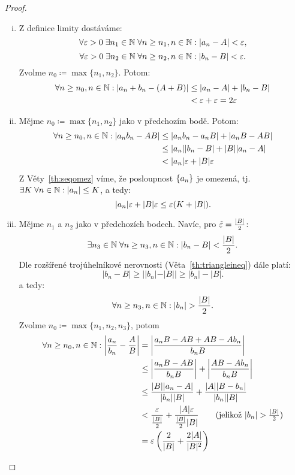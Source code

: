 \begin{proof}
    \leavevmode
    \begin{enumerate}[i.]
        \item Z definice limity dostáváme:
            $$\forall \varepsilon > 0 \; \exists n_1 \in \mathbb{N} \; \forall n \geq n_1,n\in \mathbb{N}: 
            |a_n - A| < \varepsilon,$$
            $$\forall \varepsilon > 0 \; \exists n_2 \in \mathbb{N} \; \forall n \geq n_2,n\in \mathbb{N}: 
            |b_n - B| < \varepsilon.$$
            Zvolme $n_0 \coloneqq \max\{n_1,n_2\}.$ Potom:
            \begin{align*}
                \forall n \geq n_0, n\in \mathbb{N}: 
                    |a_n + b_n - (A+B)| &\leq |a_n - A| + |b_n - B| \\
                                        &< \varepsilon + \varepsilon = 2\varepsilon
            \end{align*}
        \item Mějme $n_0 \coloneqq \max\{n_1,n_2\}$ jako v předchozím bodě. Potom:
            \begin{align*}
                \forall n \geq n_0, n\in \mathbb{N}:
                    |a_nb_n - AB| &\leq |a_nb_n - a_nB| + |a_nB - AB| \\
                                  &\leq |a_n||b_n - B| + |B||a_n - A| \\
                                  &< |a_n|\varepsilon + |B|\varepsilon
            \end{align*}
            Z Věty~\ref{th:seqomez} víme, že posloupnost $\left\{a_n\right\}$ je omezená,
            tj. $\exists K \; \forall n \in \mathbb{N}: |a_n| \leq K$, a tedy:
            $$|a_n|\varepsilon + |B|\varepsilon \leq \varepsilon(K + |B|).$$

        \item Mějme $n_1$ a $n_2$ jako v předchozích bodech. Navíc, pro $\tilde{\varepsilon}
            = \frac{|B|}{2}$:
            $$\exists n_3 \in \mathbb{N} \; \forall n \geq n_3, n \in \mathbb{N}: |b_n - B| < \frac{|B|}{2}.$$
            Dle rozšířené trojúhelníkové nerovnosti (Věta~\ref{th:triangleineq}) 
            dále platí:
            $$|b_n - B| \geq ||b_n| - |B|| \geq |b_n| - |B|.$$
            a tedy:
            $$\forall n \geq n_3, n \in \mathbb{N}: |b_n| > \frac{|B|}{2}.$$
            Zvolme $n_0 \coloneqq \max\{n_1,n_2, n_3\}$, potom
            \begin{align*}
                \fa n \geq n_0, n\in\N: 
                    \left|\frac{a_n}{b_n} - \frac{A}{B}\right| 
                    &= \left|\frac{a_nB - AB + AB -Ab_n}{b_nB}\right| \\
                    &\leq \left|\frac{a_nB - AB}{b_nB}\right|+ \left|\frac{AB -Ab_n}{b_nB}\right| \\
                    &\leq \frac{|B||a_n - A|}{|b_n||B|} + \frac{|A||B - b_n|}{|b_n||B|} \\
                    &< \frac{\e}{\frac{|B|}{2}} + \frac{|A|\e}{\frac{|B|}{2}|B|} 
                    \tag{jelikož $|b_n| > \frac{|B|}{2}$}\\
                    &= \e\left(\frac{2}{|B|}+\frac{2|A|}{|B|^2}\right)
            \end{align*}
    \end{enumerate}
\end{proof}

